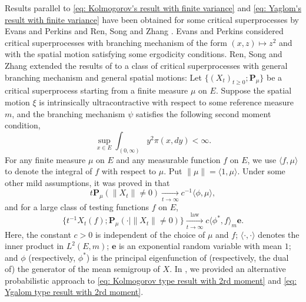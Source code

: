 \documentclass[12pt, a4paper]{amsart}
\theoremstyle{definition}
\numberwithin{equation}{section}
\begin{document}
	Results parallel to \eqref{eq: Kolmogorov's result with finite variance} and \eqref{eq: Yaglom's result with finite variance} have been obtained for some critical superprocesses by Evans and Perkins \cite{EvansPerkins1990Measure-valued} and Ren, Song and Zhang \cite{RenSongZhang2015Limit}.
	Evans and Perkins \cite{EvansPerkins1990Measure-valued} considered critical superprocesses with branching mechanism of the form $(x,z)\mapsto z^2$ and with the spatial motion satisfying some ergodicity conditions.
	Ren, Song and Zhang \cite{RenSongZhang2015Limit} extended the results of \cite{EvansPerkins1990Measure-valued} to
	a class of critical superprocesses with general branching mechanism and general spatial motions:
	Let $\{(X_t)_{t\geq 0}; \mathbf P_\mu \}$ be a critical superprocess starting from 
a finite measure $\mu$ on $E$.
	Suppose the spatial motion $\xi$ is intrinsically ultracontractive with respect to some reference measure $m$, and the branching mechanism $\psi$ satisfies the following second moment condition,
\[\label{eq: second moment condition}
	\sup_{x\in E} \int_{(0,\infty)} y^2 \pi(x,dy)
	< \infty.
\]
For any finite measure $\mu$ on $E$ and
any measurable function $f$ on $E$, we use $\langle f,\mu\rangle$	 to denote the integral of $f$ with respect to $\mu$. 
Put $\|\mu\|=\langle 1, \mu\rangle$.
	Under some other mild assumptions, it was proved in  \cite{RenSongZhang2015Limit} that
\[\label{eq: Kolmogorov type result with 2rd moment}
	t \mathbf P_\mu(\|X_t\| \neq 0)
	\xrightarrow[t\to \infty]{} c^{-1} 
\langle \phi, \mu \rangle,
\]
	and for a large class of testing functions $f$ on $E$,
\[\label{eq: Ygalom type result with 2rd moment}
	\{ t^{-1}X_t(f); \mathbf P_\mu (\cdot |\|X_t\| \neq 0)\}
	\xrightarrow[t\to \infty]{\operatorname{law}} c \langle \phi^*, f\rangle_m \mathbf e.
\]
	Here, the constant $c > 0$ is independent of the choice of $\mu$ and $f$;
$\langle\cdot, \cdot \rangle$ denotes the inner product in $L^2(E, m)$;
	$\mathbf e$ is an exponential random variable with mean $1$;
	and $\phi$ (respectively, $\phi^*$) is the principal eigenfunction of (respectively, the dual of) the generator of the mean semigroup of $X$.
	In \cite{RenSongSun2017Spine},  we %
provided an alternative probabilistic approach to \eqref{eq: Kolmogorov type result with 2rd moment} and \eqref{eq: Ygalom type result with 2rd moment}.
	
\end{document}
